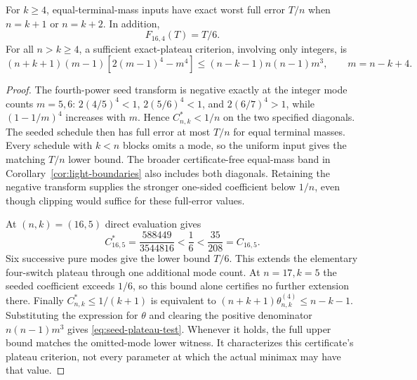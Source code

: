 \begin{corollary}\label{cor:seed-consequences}
For $k\ge4$, equal-terminal-mass inputs have exact worst full error $T/n$
when $n=k+1$ or $n=k+2$. In addition,
\begin{equation}\label{eq:extra-plateau}
 F_{16,4}(T)=T/6.
\end{equation}
For all $n>k\ge4$, a sufficient exact-plateau criterion, involving only
integers, is
\begin{equation}\label{eq:seed-plateau-test}
 (n+k+1)(m-1)[2(m-1)^4-m^4]
 \le(n-k-1)n(n-1)m^3,\qquad m=n-k+4.
\end{equation}
\end{corollary}
\begin{proof}
The fourth-power seed transform is negative exactly at the integer mode
counts $m=5,6$: $2(4/5)^4<1$, $2(5/6)^4<1$, and
$2(6/7)^4>1$, while $(1-1/m)^4$ increases with $m$. Hence $C^*_{n,k}<1/n$
on the two specified diagonals. The seeded schedule then has full error
at most $T/n$ for equal terminal masses. Every schedule with $k<n$ blocks
omits a mode, so the uniform input gives the matching $T/n$ lower bound.
The broader certificate-free equal-mass band in
Corollary~\ref{cor:light-boundaries} also includes both diagonals. Retaining
the negative transform supplies the stronger one-sided coefficient below
$1/n$, even though clipping would suffice for these full-error values.

At $(n,k)=(16,5)$ direct evaluation gives
\[
 C^*_{16,5}=\frac{588449}{3544816}<\frac16
       <\frac{35}{208}=C_{16,5}.
\]
Six successive pure modes give the lower bound $T/6$. This extends the
elementary four-switch plateau through one additional mode count.
At $n=17,k=5$ the seeded coefficient exceeds $1/6$, so this bound
alone certifies no further extension there.
Finally $C^*_{n,k}\le1/(k+1)$ is equivalent to
$(n+k+1)\theta^{(4)}_{n,k}\le n-k-1$. Substituting the expression for
$\theta$ and clearing the positive denominator $n(n-1)m^3$ gives
\eqref{eq:seed-plateau-test}. Whenever it holds, the full upper bound
matches the omitted-mode lower witness. It characterizes this certificate's
plateau criterion, not every parameter at which the actual minimax may
have that value.
\end{proof}


